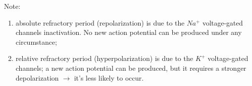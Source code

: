 \documentclass[12pt]{article}
\begin{document}
\vspace{20px}

Note: 
\begin{enumerate}
	\item absolute refractory period (repolarization) is due to the $Na^+$ voltage-gated channels inactivation. No new action potential can be produced under any circumstance;
	\item relative refractory period (hyperpolarization) is due to the $K^+$ voltage-gated channels; a new action potential can be produced, but it requires a stronger depolarization $\rightarrow$ it's less likely to occur.
\end{enumerate}
\end{document}
